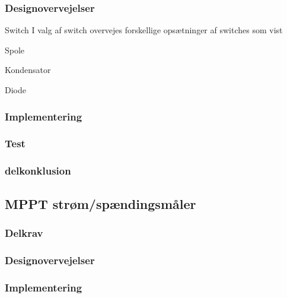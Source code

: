 \documentclass[../main.tex]{subfiles}
\begin{document}
        \subsubsection{Designovervejelser}
            
            Switch
            I valg af switch overvejes forskellige opsætninger af switches som vist 
            
            
            Spole
            
            
            
            Kondensator
            
            
            
            Diode
            
            
            
            
        \subsubsection{Implementering}
            
            
            
            
        \subsubsection{Test}
            
            
            
            
        \subsubsection{delkonklusion}
            
            
            
            
    \subsection{MPPT strøm/spændingsmåler}
            
        \subsubsection{Delkrav}
            
        \subsubsection{Designovervejelser}
            
        \subsubsection{Implementering}
            
\end{document}
